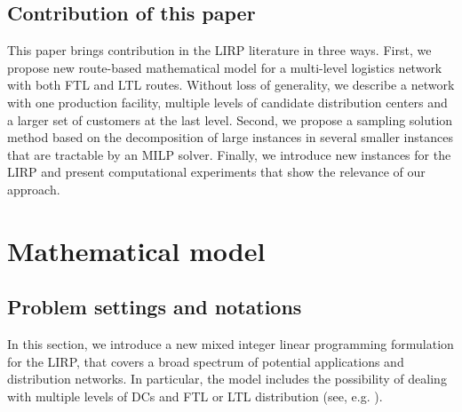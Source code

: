 \documentclass[a4paper,10pt]{article}
\begin{document}
\begin{linenumbers}
\subsection{Contribution of this paper}

This paper brings contribution in the LIRP literature in three ways. 
First, we propose new route-based mathematical model for a multi-level logistics network with both FTL and LTL routes. 
Without loss of generality, we describe a network with one production facility, multiple levels of candidate distribution centers and a larger set of customers at the last level. 
Second, we propose a sampling solution method based on the decomposition of large instances in several smaller instances that are tractable by an MILP solver. 
Finally, we introduce new instances for the LIRP and present computational experiments that show the relevance of our approach. 



\section{Mathematical model}

\label{sec:model}

\subsection{Problem settings and notations}\label{subsection:settings}




In this section, we introduce a new mixed integer linear programming formulation for the LIRP, 
that covers a broad spectrum of potential applications and distribution networks. 
In particular, the model includes the possibility of dealing with multiple levels of DCs and FTL or LTL distribution (see, e.g. \cite{AmbScu05}). 


\end{linenumbers}
\end{document}
